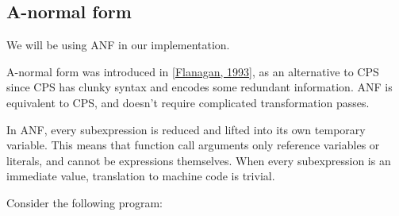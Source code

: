 \documentclass{book}
\newcommand{\Ssubsubsection}[2]{\subsubsection[#1]{#2}}
\renewcommand{\Ssubsubsection}[2]{\subsection[#1]{#2}}
\begin{document}
\Ssubsubsection{A{-}normal form}{A{-}normal form}\label{t:x28part_x22Ax2dnormalx5fformx22x29}

We will be using ANF in our implementation.

A{-}normal form was introduced in [\hyperref[t:x28cite_x22Flanaganx2c_1993x22x29]{Flanagan, 1993}], as an alternative
to CPS since CPS has clunky syntax and encodes some redundant information.
ANF is equivalent to CPS, and doesn{'}t require complicated transformation
passes.

In ANF, every subexpression is reduced and lifted into its own temporary
variable. This means that function call arguments only reference variables
or literals, and cannot be expressions themselves. When every
subexpression is an immediate value, translation to machine code is
trivial.

Consider the following program:
\end{document}
